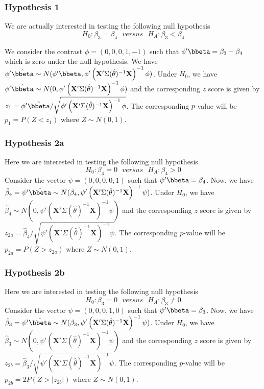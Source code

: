 \documentclass[]{article}
\begin{document}
\subsubsection{Hypothesis 1}

We are actually interested in testing the following null hypothesis
\[H_0: \beta_3 = \beta_4 ~~~ versus~~~ H_A: \beta_3 < \beta_4\]

We consider the contrast \(\phi = (0, 0, 0, 1, -1)\) such that \(\phi' \bbeta = \beta_3 - \beta_4\) which is zero under the null hypothesis. We have \(\phi'\hat{\bbeta} \sim N(\phi'\bbeta, \phi' \left(\mathbf{X}' \Sigma(\hat{\theta})^{-1} \mathbf{X} \right)^{-1} \phi)\). Under \(H_0\), we have \(\phi'\hat{\bbeta} \sim N(0, \phi' \left(\mathbf{X}' \Sigma(\hat{\theta})^{-1} \mathbf{X} \right)^{-1} \phi)\) and the corresponding \(z\) score is given by \(z_1 = \phi'\hat{\bbeta} / \sqrt{\phi' \left(\mathbf{X}' \Sigma(\hat{\theta})^{-1} \mathbf{X} \right)^{-1} \phi}\). The corresponding \(p\)-value will be \(p_1 = P(Z < z_1)\) where \(Z \sim N(0, 1)\).

\subsubsection{Hypothesis 2a}

Here we are interested in testing the following null hypothesis
\[H_0: \beta_4 = 0 ~~~ versus~~~ H_A: \beta_4 > 0\]
Consider the vector \(\psi = (0, 0, 0, 0, 1)\) such that \(\psi' \bbeta = \beta_4\). Now, we have \(\hat{\beta}_4 = \psi'\hat{\bbeta} \sim N(\beta_4, \psi' \left(\mathbf{X}' \Sigma(\hat{\theta})^{-1} \mathbf{X} \right)^{-1} \psi)\). Under \(H_0\), we have \(\hat{\beta}_4 \sim N(0, \psi' \left(\mathbf{X}' \Sigma(\hat{\theta})^{-1} \mathbf{X} \right)^{-1} \psi)\) and the corresponding \(z\) score is given by \(z_{2a} = \hat{\beta}_4 / \sqrt{\psi' \left(\mathbf{X}' \Sigma(\hat{\theta})^{-1} \mathbf{X} \right)^{-1} \psi}\). The corresponding \(p\)-value will be \(p_{2a} = P(Z > z_{2a})\) where \(Z \sim N(0, 1)\).

\subsubsection{Hypothesis 2b}

Here we are interested in testing the following null hypothesis
\[H_0: \beta_3 = 0 ~~~ versus~~~ H_A: \beta_3 \neq 0\]
Consider the vector \(\psi = (0, 0, 0, 1, 0)\) such that \(\psi' \bbeta = \beta_3\). Now, we have \(\hat{\beta}_3 = \psi'\hat{\bbeta} \sim N(\beta_3, \psi' \left(\mathbf{X}' \Sigma(\hat{\theta})^{-1} \mathbf{X} \right)^{-1} \psi)\). Under \(H_0\), we have \(\hat{\beta}_3 \sim N(0, \psi' \left(\mathbf{X}' \Sigma(\hat{\theta})^{-1} \mathbf{X} \right)^{-1} \psi)\) and the corresponding \(z\) score is given by \(z_{2b} = \hat{\beta}_3 / \sqrt{\psi' \left(\mathbf{X}' \Sigma(\hat{\theta})^{-1} \mathbf{X} \right)^{-1} \psi}\). The corresponding \(p\)-value will be \(p_{2b} = 2P(Z > |z_{2b}|)\) where \(Z \sim N(0, 1)\).
\end{document}
